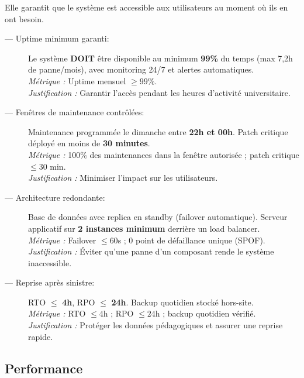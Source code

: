 Elle garantit que le système est accessible aux utilisateurs
au moment où ils en ont besoin.

\begin{description}

    \item[ — Uptime minimum garanti:]
    Le système \textbf{DOIT} être disponible au minimum \textbf{99\%}
    du temps (max 7,2h de panne/mois), avec monitoring 24/7
    et alertes automatiques.\\
    \textit{Métrique :} Uptime mensuel $\geq 99\%$.\\
    \textit{Justification :} Garantir l'accès pendant les heures
    d'activité universitaire.

    \item[ — Fenêtres de maintenance contrôlées:]
    Maintenance programmée le dimanche entre \textbf{22h et 00h}.
    Patch critique déployé en moins de \textbf{30 minutes}.\\
    \textit{Métrique :} 100\% des maintenances dans la fenêtre
    autorisée ; patch critique $\leq 30$ min.\\
    \textit{Justification :} Minimiser l'impact sur les utilisateurs.

    \item[ — Architecture redondante:]
    Base de données avec replica en standby (failover automatique).
    Serveur applicatif sur \textbf{2 instances minimum} derrière
    un load balancer.\\
    \textit{Métrique :} Failover $\leq 60$s ;
    0 point de défaillance unique (SPOF).\\
    \textit{Justification :} Éviter qu'une panne d'un composant
    rende le système inaccessible.

    \item[ — Reprise après sinistre:]
    RTO $\leq$ \textbf{4h}, RPO $\leq$ \textbf{24h}.
    Backup quotidien stocké hors-site.\\
    \textit{Métrique :} RTO $\leq 4$h ; RPO $\leq 24$h ;
    backup quotidien vérifié.\\
    \textit{Justification :} Protéger les données pédagogiques
    et assurer une reprise rapide.

\end{description}

\subsection{Performance}


